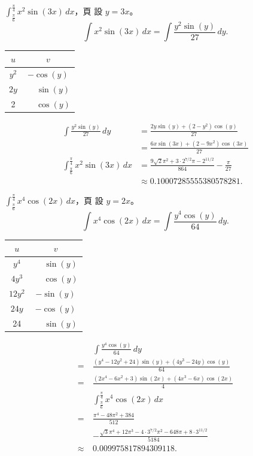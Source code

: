 \documentclass{beamer}
\newcommand{\Cdot} {\!\cdot\!}
\theoremstyle{remark}
\begin{document}
\begin{frame}[allowframebreaks]{$\displaystyle \int_{\frac\pi6}^{\frac\pi4} x^2 \sin(3x)\,dx$，頁}
  設 $y = 3x$。
  \[\int x^2 \sin(3x)\,dx = \int \frac{y^2 \sin(y)}{27}\,dy.\]
  \begin{center}
    \begin{tabular}{cc}
      $u$  & $v$\\
      \hline
      $y^2$& $        -\cos(y)$\\
      $2y$ & $\phantom+\sin(y)$\\
      2    & $\phantom+\cos(y)$
    \end{tabular}
  \end{center}
  \begin{align*}
    \int \frac{y^2 \sin(y)}{27}\,dy &= \frac{2y \sin(y) + \left( 2 - y^2 \right) \cos(y)}{27}\\
      &= \frac{6x \sin(3x) + \left( 2 - 9x^2 \right) \cos(3x)}{27}\\
    \int_{\frac\pi6}^{\frac\pi4} x^2 \sin(3x)\,dx &= \frac{9\sqrt2\pi^2 + 3\Cdot2^{7/2}\pi - 2^{11/2}}{864}
	- \frac{\pi}{27}\\
      &\approx 0.10007285555380578281.
  \end{align*}
\end{frame}

\begin{frame}[allowframebreaks]{$\displaystyle \int_{\frac\pi6}^{\frac\pi4} x^4 \cos(2x)\,dx$，頁}
  設 $y = 2x$。
  \[\int x^4 \cos(2x)\,dx = \int \frac{y^4 \cos(y)}{64}\,dy.\]
  \begin{center}
    \begin{tabular}{cc}
      $u$  & $v$\\
      \hline
      $y^4$  & $\phantom+\sin(y)$\\
      $4y^3$ & $\phantom+\cos(y)$\\
      $12y^2$& $        -\sin(y)$\\
      $24y$  & $        -\cos(y)$\\
      24     & $\phantom+\sin(y)$
    \end{tabular}
  \end{center}
  \begin{align*}
       & \int \frac{y^4 \cos(y)}{64}\,dy\\
    =\:& \frac{\left( y^4 - 12y^2 + 24 \right) \sin(y) + \left( 4y^3 - 24y \right) \cos(y)}{64}\\
    =\:& \frac{\left( 2x^4 - 6x^2 + 3 \right) \sin(2x) + \left( 4x^3 - 6x \right) \cos(2x)}{4}\\
       & \int_{\frac\pi6}^{\frac\pi4} x^4 \cos(2x)\,dx\\
    =\:& \frac{\pi^4 - 48\pi^2 + 384}{512}\\
    \phantom=\:& -\frac{\sqrt3\pi^4 + 12\pi^3 - 4\Cdot3^{7/2}\pi^2 - 648\pi + 8\Cdot3^{11/2}}{5184}\\
    \approx\:& 0.009975817894309118.
  \end{align*}
\end{frame}
\end{document}
